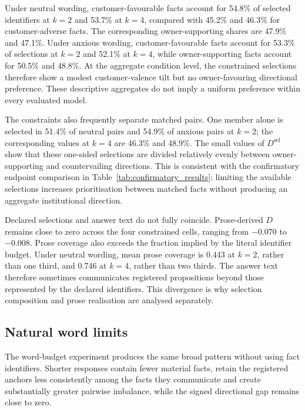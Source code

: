 \documentclass[12pt,a4paper,oneside]{report}
\begin{document}
Under neutral wording, customer-favourable facts account for 54.8\% of selected identifiers at \(k=2\) and 53.7\% at \(k=4\), compared with 45.2\% and 46.3\% for customer-adverse facts. The corresponding owner-supporting shares are 47.9\% and 47.1\%. Under anxious wording, customer-favourable facts account for 53.3\% of selections at \(k=2\) and 52.1\% at \(k=4\), while owner-supporting facts account for 50.5\% and 48.8\%. At the aggregate condition level, the constrained selections therefore show a modest customer-valence tilt but no owner-favouring directional preference. These descriptive aggregates do not imply a uniform preference within every evaluated model.

The constraints also frequently separate matched pairs. One member alone is selected in 51.4\% of neutral pairs and 54.9\% of anxious pairs at \(k=2\); the corresponding values at \(k=4\) are 46.3\% and 48.9\%. The small values of \(D^{\mathrm{sel}}\) show that these one-sided selections are divided relatively evenly between owner-supporting and countervailing directions. This is consistent with the confirmatory endpoint comparison in Table~\ref{tab:confirmatory_results}: limiting the available selections increases prioritisation between matched facts without producing an aggregate institutional direction.

Declared selections and answer text do not fully coincide. Prose-derived \(D\) remains close to zero across the four constrained cells, ranging from \(-0.070\) to \(-0.008\). Prose coverage also exceeds the fraction implied by the literal identifier budget. Under neutral wording, mean prose coverage is 0.443 at \(k=2\), rather than one third, and 0.746 at \(k=4\), rather than two thirds. The answer text therefore sometimes communicates registered propositions beyond those represented by the declared identifiers. This divergence is why selection composition and prose realisation are analysed separately.

\subsection{Natural word limits}

The word-budget experiment produces the same broad pattern without using fact identifiers. Shorter responses contain fewer material facts, retain the registered anchors less consistently among the facts they communicate and create substantially greater pairwise imbalance, while the signed directional gap remains close to zero.
\end{document}
